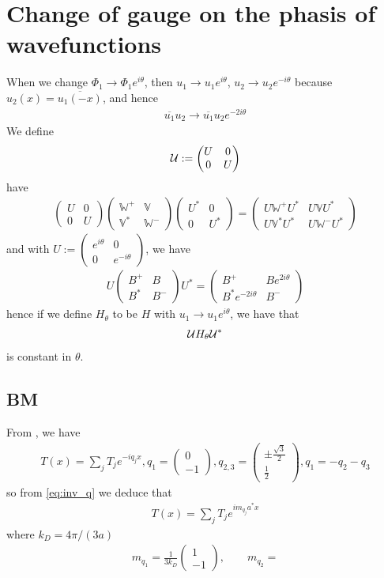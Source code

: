 \documentclass[11pt,a4paper,reqno,french,tikz]{amsart}
\newcommand{\f}[2]{\frac{#1}{#2}} %
\newcommand{\mat}[1]{\begin{pmatrix} #1 \end{pmatrix}} %
\newcommand{\bbV}{\mathbb{V}}
\def\bbV{{\mathbb V}}
\def\bbW{{\mathbb W}}
\begin{document}
\section{Change of gauge on the phasis of wavefunctions}%
\label{sec:change_of_gauge_on_the_phasis_of_wavefunctions}

When we change $\Phi_1 \rightarrow \Phi_1 e^{i\theta}$, then $u_1 \rightarrow u_1 e^{i\theta}$, $u_2 \rightarrow u_2 e^{-i\theta}$ because $u_2(x) = \overline{u_1(-x)}$, and hence
\begin{align*}
\boxed{\overline{u_1} u_2 \rightarrow \overline{u_1} u_2 e^{-2i\theta}}
\end{align*}
We define
\begin{align*}
	\cU := \mat{U & 0 \\ 0 & U}
\end{align*}
have
\begin{align*}
	\mat{U & 0 \\ 0 & U} \mat{\bbW^+ & \bbV \\ \bbV^* & \bbW^-}  \mat{U^* & 0 \\ 0 & U^*} = \mat{U\bbW^+ U^* & U\bbV U^*\\ U\bbV^*U^* & U\bbW^-U^*}
\end{align*}
and with $U := \mat{e^{i\theta} & 0 \\  0 & e^{-i\theta}}$, we have
\begin{align*}
	U \mat{B^+ & B \\ B^* & B^-} U^* = \mat{B^+ & B e^{2i\theta} \\ B^* e^{-2i\theta} & B^-}
\end{align*}
hence if we define $H_\theta$ to be $H$ with $u_1 \rightarrow u_1 e^{i\theta}$, we have that
\begin{align*}
\mathcal{U} H_\theta \mathcal{U}^*
\end{align*}
is constant in $\theta$.


\subsection{BM}%
\label{sub:bm}

From \cite{TarKruVis19}, we have
\begin{align*}
T(x) = \sum_j T_j e^{-iq_j x}, q_1 = \mat{0 \\ -1}, q_{2,3} = \mat{\pm\f{\sqrt 3}{2} \\ \f{1}{2}}, q_1 = -q_2 - q_3
\end{align*}
so from \eqref{eq:inv_q} we deduce that
\begin{align*}
T(x) = \sum_j T_j e^{im_{q_j} a^* x}
\end{align*}
where $k_D = 4\pi/(3a)$
\begin{align*}
m_{q_1} = \f{1}{3k_D} \mat{1 \\ -1}, \qquad m_{q_2} = 
\end{align*}
\end{document}
